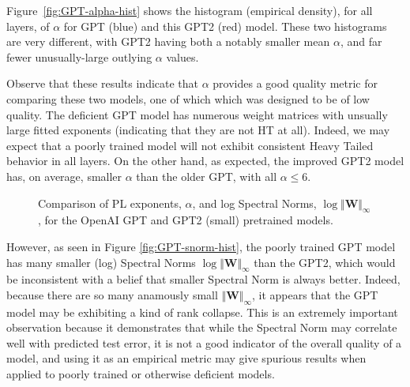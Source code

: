 Figure~\ref{fig:GPT-alpha-hist} shows the histogram (empirical density), for all layers, of $\alpha$ for GPT (blue) and this GPT2 (red) model.  
These two histograms are very different, with GPT2 having both a notably smaller mean $\alpha$, and far fewer unusually-large outlying $\alpha$ values.

Observe that these results indicate that $\alpha$ provides a good quality metric for comparing these two models, one of which which was designed to be of low quality.
The deficient GPT model has numerous weight matrices with unsually large fitted exponents (indicating that they are not HT at all).  
Indeed, we may expect that a poorly trained model will not exhibit consistent Heavy Tailed behavior in all layers.
On the other hand, as expected, the improved GPT2 model has, on average, smaller $\alpha$ than the older GPT, with all $\alpha\le6$.  


\begin{figure}
    \centering
   \caption{Comparison of PL exponents, $\alpha$, and log Spectral Norms, $\log\Vert\mathbf{W}\Vert_{\infty}$, for the OpenAI GPT and GPT2 (small) pretrained models.}
\label{fig:GPT-hist}
\end{figure}

However, as seen in Figure \ref{fig:GPT-snorm-hist},
 the poorly trained GPT model has many smaller (log) Spectral Norms $\log\Vert\mathbf{W}\Vert_{\infty}$
than the GPT2, which would be inconsistent with a belief that smaller Spectral Norm is always better.
Indeed, because there are so many anamously small $\Vert\mathbf{W}\Vert_{\infty}$,
it appears that the GPT model may be exhibiting a kind of rank collapse.
This is an extremely important observation because it demonstrates that while the Spectral Norm
may correlate well with predicted test error, it is not a good indicator of the overall quality of a model,
and using it as an empirical metric may give spurious results when applied to poorly trained
or otherwise deficient models.  



